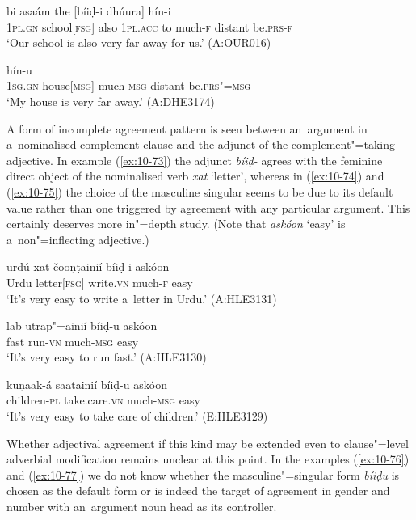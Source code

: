 \begin{exe}
\ex
\label{ex:10-71}
 bi asaám the [bíiḍ-i dhúura] hín-i \\
\textsc{1pl.gn} school[\textsc{fsg}] also \textsc{1pl.acc} to much-\textsc{f} distant be.\textsc{prs-f}  \\
\glt `Our school is also very far away for us.' (A:OUR016)

\ex
\label{ex:10-72}
 hín-u \\
\textsc{1sg.gn} house[\textsc{msg}] much-\textsc{msg} distant be.\textsc{prs"=msg}  \\
\glt `My house is very far away.' (A:DHE3174)
\end{exe}

A form of incomplete agreement pattern is seen between an~argument in a~nominalised complement clause and the adjunct of the complement"=taking adjective. In example (\ref{ex:10-73}) the adjunct \textit{bíiḍ-} agrees with the feminine direct object of the nominalised verb \textit{xat} `letter', whereas in (\ref{ex:10-74}) and (\ref{ex:10-75}) the choice of the masculine singular seems to be due to its default value rather than one triggered by agreement with any particular argument. This certainly deserves more in"=depth study. (Note that \textit{askóon} `easy' is a~non"=inflecting adjective.)

\begin{exe}
\ex
\label{ex:10-73}
\gll urdú xat čooṇṭainií bíiḍ-i askóon \\
Urdu letter[\textsc{fsg}] write.\textsc{vn} much-\textsc{f} easy  \\
\glt `It's very easy to write a~letter in Urdu.' (A:HLE3131)

\ex
\label{ex:10-74}
\gll lab utrap"=ainií bíiḍ-u askóon \\
fast run-\textsc{vn} much-\textsc{msg} easy \\
\glt `It's very easy to run fast.' (A:HLE3130)

\ex
\label{ex:10-75}
\gll kuṇaak-á saatainií bíiḍ-u askóon \\
children-\textsc{pl} take.care.\textsc{vn} much-\textsc{msg} easy \\
\glt `It's very easy to take care of children.' (E:HLE3129)
\end{exe}

Whether adjectival agreement if this kind may be extended even to clause"=level adverbial modification remains unclear at this point. In the examples (\ref{ex:10-76}) and (\ref{ex:10-77}) we do not know whether the masculine"=singular form \textit{bíiḍu} is chosen as the default form or is indeed the target of agreement in gender and number with an~argument noun head as its controller.

